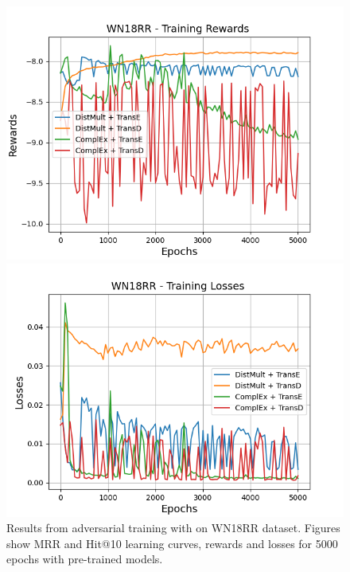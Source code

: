 \begin{figure}
    \begin{minipage}{.45\textwidth}
      \centering
      \includegraphics[width=0.9\linewidth]{figures/results/gan_train/pretrained/uncertainty/max/entropy/wn18rr/5k_epochs/uncertainty_wn18rr_rew.png}
    \end{minipage}%
     \begin{minipage}{.45\textwidth}
      \centering
      \includegraphics[width=0.9\linewidth]{figures/results/gan_train/pretrained/uncertainty/max/entropy/wn18rr/5k_epochs/uncertainty_wn18rr_losses.png}
    \end{minipage}%
    \caption{Results from adversarial training with \usmax on \textsc{WN18RR} dataset.
    Figures show MRR and Hit@10 learning curves, rewards and losses for 5000 epochs with pre-trained models.}
    \label{fig:gan_train_pretrained_usmax_wn18rr}
\end{figure}
